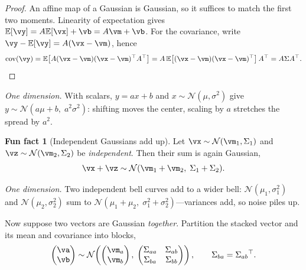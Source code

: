 \documentclass[11pt]{article}
\theoremstyle{plain}
\theoremstyle{definition}
\theoremstyle{remark}
\theoremstyle{definition}
\newtheorem{funfact}{Fun fact}
\newcommand{\E}{\mathbb{E}}
\newcommand{\Normal}{\mathcal{N}}
\begin{document}
\begin{proof}
An affine map of a Gaussian is Gaussian, so it suffices to match the first two
moments. Linearity of expectation gives $\E[\vy] = A\E[\vx] + \vb = A\vm + \vb$.
For the covariance, write $\vy - \E[\vy] = A(\vx - \vm)$, hence
\begin{equation}
    \cov(\vy) = \E\!\left[A(\vx-\vm)(\vx-\vm)\trp A\trp\right]
              = A\,\E\!\left[(\vx-\vm)(\vx-\vm)\trp\right] A\trp
              = A \Sigma A\trp. \qedhere
\end{equation}
\end{proof}

\emph{One dimension.} With scalars, $y = ax + b$ and $x \sim \Normal(\mu,
\sigma^2)$ give $y \sim \Normal(a\mu + b,\; a^2\sigma^2)$: shifting moves the
center, scaling by $a$ stretches the spread by $a^2$.

\begin{funfact}[Independent Gaussians add up]\label{fact:sum}
Let $\vx \sim \Normal(\vm_1, \Sigma_1)$ and $\vz \sim \Normal(\vm_2, \Sigma_2)$
be \emph{independent}. Then their sum is again Gaussian,
\begin{equation}\label{eq:sum}
    \vx + \vz \sim \Normal(\vm_1 + \vm_2,\; \Sigma_1 + \Sigma_2).
\end{equation}
\end{funfact}

\emph{One dimension.} Two independent bell curves add to a wider bell:
$\Normal(\mu_1, \sigma_1^2)$ and $\Normal(\mu_2, \sigma_2^2)$ sum to
$\Normal(\mu_1 + \mu_2,\; \sigma_1^2 + \sigma_2^2)$---variances add, so noise
piles up.

Now suppose two vectors are Gaussian \emph{together}. Partition the stacked
vector and its mean and covariance into blocks,
\begin{equation}\label{eq:joint}
    \begin{pmatrix} \va \\ \vb \end{pmatrix}
    \sim \Normal\!\left(
        \begin{pmatrix} \vm_a \\ \vm_b \end{pmatrix},\;
        \begin{pmatrix}
            \Sigma_{aa} & \Sigma_{ab} \\
            \Sigma_{ba} & \Sigma_{bb}
        \end{pmatrix}
    \right),
    \qquad \Sigma_{ba} = \Sigma_{ab}\trp .
\end{equation}
\end{document}
